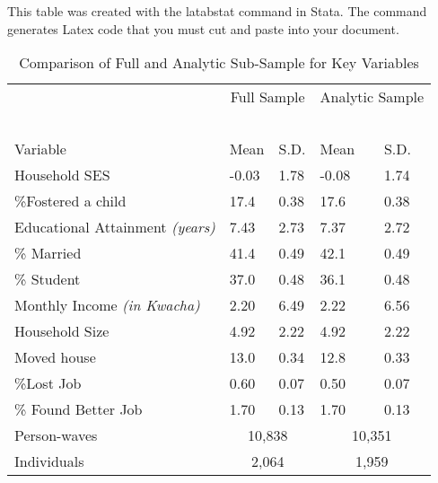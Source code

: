 \begin{singlespace}
This table was created with the latabstat command in Stata. The command generates Latex code that you must cut and paste into your document.
\end{singlespace}

\begin{table}[h]
\caption{Comparison of Full and Analytic Sub-Sample for Key Variables}
\label{Table A.1}       %
\begin{tabular}{l l l | l l}
 \hline
 ~				&\multicolumn{2}{c|}{Full Sample} &\multicolumn{2}{c}{Analytic Sample} \\
 ~				&~			&~			&~			&~	\\
Variable 			& Mean 		& S.D. 		& Mean 		& S.D.\\ 
\hline
Household SES  	& -0.03 		& 1.78 		& -0.08 		& 1.74\\ 
\%Fostered a child 	& 17.4 		& 0.38 		& 17.6 		& 0.38\\ 
Educational Attainment \textit{(years)} & 7.43 		& 2.73 		& 7.37 		& 2.72\\ 
\% Married 		& 41.4		& 0.49 		& 42.1 		& 0.49\\ 
\% Student 		& 37.0 		& 0.48 		& 36.1 		& 0.48\\ 
Monthly Income \textit{(in Kwacha)} 		&  2.20  		&  6.49  		&  2.22  	&  6.56 \\ 
Household Size 	& 4.92 		& 2.22 		& 4.92 		& 2.22\\ 
Moved house 		& 13.0 		& 0.34 		& 12.8 		& 0.33\\ 
\%Lost Job 		& 0.60 		& 0.07 		& 0.50 		& 0.07\\ 
\% Found Better Job & 1.70 		& 0.13 		& 1.70 		& 0.13 \\
\hline
Person-waves		&\multicolumn{2}{c}{10,838} &\multicolumn{2}{c}{10,351} \\
Individuals		&\multicolumn{2}{c}{2,064} &\multicolumn{2}{c}{1,959} \\
\end{tabular}
\end{table}		

